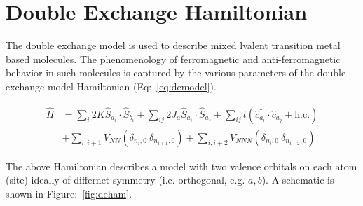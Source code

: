 \documentclass[12pt,twoside]{report}
\begin{document}
	\chapter{Double Exchange Hamiltonian}
	
	The double exchange model is used to describe mixed lvalent transition
	metal based molecules. The phenomenology of ferromagnetic and anti-ferromagnetic
	behavior in such molecules is captured by the various parameters of the
	double exchange model Hamiltonian (Eq:~\ref{eq:demodel}).
	
	\begin{equation}
		\begin{split}
			\hat{H} & = \sum_i 2K \hat{S}_{a_i}\cdot\hat{S}_{b_i} 
			+ \sum_{ij} 2J_a \hat{S}_{a_i}\cdot\hat{S}_{a_j} 
			+ \sum_{ij} t\left( \hat{c}^{\dagger}_{a_i}\cdot\hat{c}_{a_j} + \text{h.c.}\right ) \\
		&	+ \sum_{i,i+1} V_{NN}\left ( \delta_{n_i,0}\ \delta_{n_{i+1},0} \right ) 
			+ \sum_{i,i+2} V_{NNN}\left ( \delta_{n_i,0}\ \delta_{n_{i+2},0} \right )
		\end{split}
		\label{eq:demodel}
	\end{equation}
	
	The above Hamiltonian describes a model with two valence orbitals on each
	atom (site) ideally of differnet symmetry (i.e. orthogonal, e.g. $a,b$). A schematic is shown in
	Figure:~\ref{fig:deham}.
	
			
			
	
\end{document}
